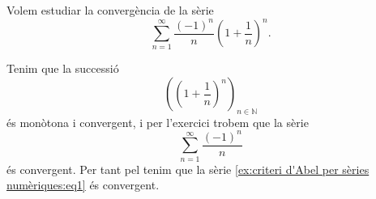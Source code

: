 \documentclass[../../main.tex]{subfiles}
\begin{document}
    \begin{example}
        \label{ex:criteri d'Abel per sèries numèriques}
        Volem estudiar la convergència de la sèrie
        \begin{equation}
            \label{ex:criteri d'Abel per sèries numèriques:eq1}
            \sum_{n=1}^{\infty}\frac{(-1)^{n}}{n}\left(1+\frac{1}{n}\right)^{n}.
        \end{equation}
        \begin{solution}
            Tenim que la successió %
            \[
                \left(\left(1+\frac{1}{n}\right)^{n}\right)_{n\in\mathbb{N}}
            \]
            és monòtona i convergent, i per l'exercici  trobem que la sèrie
            \[
                \sum_{n=1}^{\infty}\frac{(-1)^{n}}{n}
            \]
            és convergent.
            Per tant pel  tenim que la sèrie \eqref{ex:criteri d'Abel per sèries numèriques:eq1} és convergent.
        \end{solution}
    \end{example}
\end{document}
